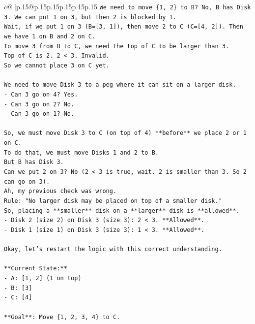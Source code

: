 \documentclass{article}
\begin{document}
{\begin{supertabular}{c@{$\;$}|p{.15\linewidth}@{}p{.15\linewidth}p{.15\linewidth}p{.15\linewidth}p{.15\linewidth}p{.15\linewidth}}
{{{\texttt{We need to move \{1, 2\} to B? No, B has Disk 3. We can put 1 on 3, but then 2 is blocked by 1.} \\
\texttt{Wait, if we put 1 on 3 (B={[}3, 1{]}), then move 2 to C (C={[}4, 2{]}). Then we have 1 on B and 2 on C.} \\
\texttt{To move 3 from B to C, we need the top of C to be larger than 3.} \\
\texttt{Top of C is 2. 2 < 3. Invalid.} \\
\texttt{So we cannot place 3 on C yet.} \\
\\ 
\texttt{We need to move Disk 3 to a peg where it can sit on a larger disk.} \\
\texttt{{-} Can 3 go on 4? Yes.} \\
\texttt{{-} Can 3 go on 2? No.} \\
\texttt{{-} Can 3 go on 1? No.} \\
\\ 
\texttt{So, we must move Disk 3 to C (on top of 4) **before** we place 2 or 1 on C.} \\
\texttt{To do that, we must move Disks 1 and 2 to B.} \\
\texttt{But B has Disk 3.} \\
\texttt{Can we put 2 on 3? No (2 < 3 is true, wait. 2 is smaller than 3. So 2 can go on 3).} \\
\texttt{Ah, my previous check was wrong.} \\
\texttt{Rule: "No larger disk may be placed on top of a smaller disk."} \\
\texttt{So, placing a **smaller** disk on a **larger** disk is **allowed**.} \\
\texttt{{-} Disk 2 (size 2) on Disk 3 (size 3): 2 < 3. **Allowed**.} \\
\texttt{{-} Disk 1 (size 1) on Disk 3 (size 3): 1 < 3. **Allowed**.} \\
\\ 
\texttt{Okay, let's restart the logic with this correct understanding.} \\
\\ 
\texttt{**Current State:**} \\
\texttt{{-} A: {[}1, 2{]} (1 on top)} \\
\texttt{{-} B: {[}3{]}} \\
\texttt{{-} C: {[}4{]}} \\
\\ 
\texttt{**Goal**: Move \{1, 2, 3, 4\} to C.} \\
}}}
\end{supertabular}}
\end{document}
